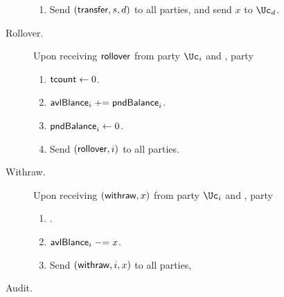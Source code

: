 \begin{functionality}
\begin{description}
\begin{enumerate}
		\item Send $(\mathsf{transfer},s,d)$ to all parties, and send $x$ to $\Uc_d$.
			
		\end{enumerate}
		
		\item[Rollover.]     Upon receiving $\mathsf{rollover}$ from  party $\Uc_i$ and \Cc,  party \Cc
		
		\begin{enumerate}
			
			
			\item $\mathsf{tcount} \leftarrow 0$.
			
			
			\item  $\mathsf{avlBlance}_i  \mathrel{+}= \mathsf{pndBalance}_i$.
			
			\item  $\mathsf{pndBalance}_i  \leftarrow 0$.
			
			
			
			\item  Send $ (\mathsf{rollover},i)$ to all parties.
		\end{enumerate}

		
			\item[Withraw.]     Upon receiving $(\mathsf{withraw},x)$ from  party $\Uc_i$ and \Cc,  party \Cc
		
		\begin{enumerate}
			
			
			 \item \Assert{$x\in (q) \sland \balance_i  \ge x$}.
			
			\item $\mathsf{avlBlance}_i \mathrel{-}= x$.
			
			
			
			\item Send $(\mathsf{withraw},i,x)$ to all parties,
			
		\end{enumerate}
		
		
		
		\item[Audit.]      
		
	\end{description}

\end{functionality}



